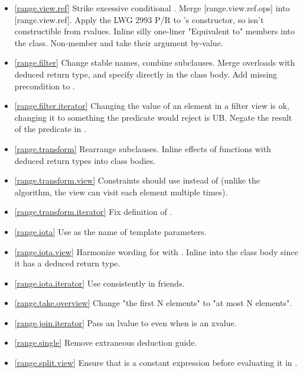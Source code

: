 \begin{itemize}
\item \ref{range.view.ref} Strike excessive conditional .
  Merge [range.view.ref.ops] into [range.view.ref].
  Apply the LWG 2993 P/R to 's constructor, so
   isn't constructible from rvalues.
  Inline silly one-liner "\effects Equivalent to" members into the class.
  Non-member  and  take their argument by-value.
\item \ref{range.filter} Change stable names, combine subclauses.
  Merge  overloads with deduced return type,
  and specify directly in the class body.
  Add missing precondition to .
\item \ref{range.filter.iterator}
  Changing the value of an element in a filter view is ok, changing it to
  something the predicate would reject is UB.
  Negate the result of the predicate in .
\item \ref{range.transform} Rearrange subclauses. Inline effects of functions
  with deduced return types into class bodies.
\item \ref{range.transform.view}
  Constraints should use  instead of 
  (unlike the algorithm, the view can visit each element multiple times).
\item \ref{range.transform.iterator} Fix definition of .
\item \ref{range.iota} Use  as the name of 
  template parameters.
\item \ref{range.iota.view} Harmonize wording for
   with .
  Inline  into the class body since it has a deduced return type.
\item \ref{range.iota.iterator} Use  consistently in friends.
\item \ref{range.take.overview} Change "the first N elements" to
  "at most N elements".
\item \ref{range.join.iterator} Pass an lvalue to
   even when  is an xvalue.
\item \ref{range.single} Remove extraneous 
  deduction guide.
\item \ref{range.split.view} Ensure that 
  is a constant expression before evaluating it in
  .

\end{itemize}
